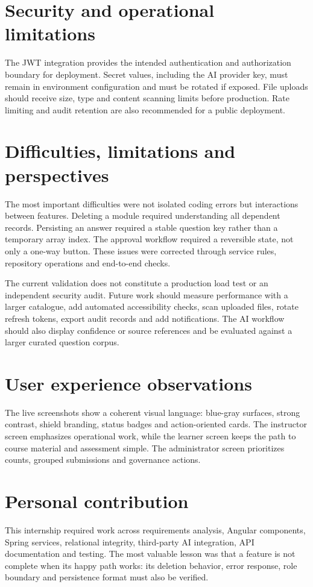 \section{Security and operational limitations}
The JWT integration provides the intended authentication and authorization
boundary for deployment. Secret values, including the AI provider key, must
remain in environment configuration and must be rotated if exposed. File
uploads should receive size, type and content scanning limits before production.
Rate limiting and audit retention are also recommended for a public
deployment.

\section{Difficulties, limitations and perspectives}
The most important difficulties were not isolated coding errors but
interactions between features. Deleting a module required understanding all
dependent records. Persisting an answer required a stable question key rather
than a temporary array index. The approval workflow required a reversible
state, not only a one-way button. These issues were corrected through service
rules, repository operations and end-to-end checks.

The current validation does not constitute a production load test or an
independent security audit. Future work should measure performance with a
larger catalogue, add automated accessibility checks, scan uploaded files,
rotate refresh tokens, export audit records and add notifications. The AI
workflow should also display confidence or source references and be evaluated
against a larger curated question corpus.

\section{User experience observations}
The live screenshots show a coherent visual language: blue-gray surfaces,
strong contrast, shield branding, status badges and action-oriented cards.
The instructor screen emphasizes operational work, while the learner screen
keeps the path to course material and assessment simple. The administrator
screen prioritizes counts, grouped submissions and governance actions.

\section{Personal contribution}
This internship required work across requirements analysis, Angular
components, Spring services, relational integrity, third-party AI integration,
API documentation and testing. The most valuable lesson was that a feature is
not complete when its happy path works: its deletion behavior, error response,
role boundary and persistence format must also be verified.


